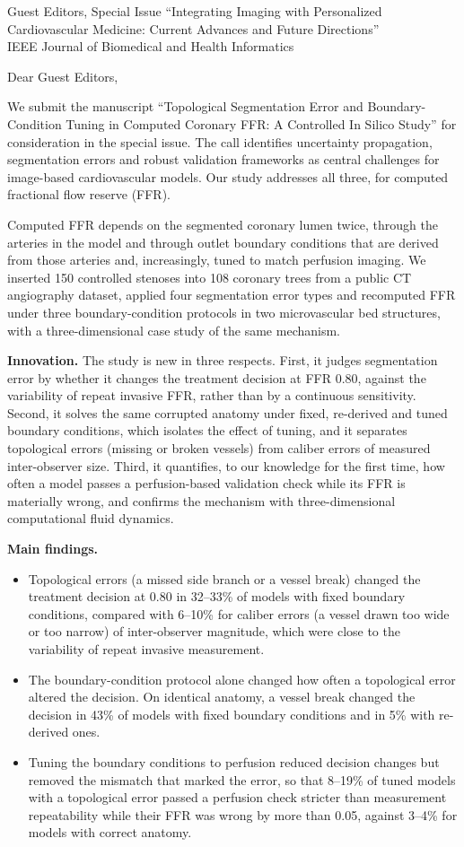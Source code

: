 \documentclass[10pt]{letter}
\date{\today}
\begin{document}
\begin{letter}{Guest Editors, Special Issue ``Integrating Imaging with Personalized Cardiovascular Medicine: Current
Advances and Future Directions''\\IEEE Journal of Biomedical and Health Informatics}
\opening{Dear Guest Editors,}

We submit the manuscript ``Topological Segmentation Error and Boundary-Condition Tuning in Computed Coronary FFR: A
Controlled In Silico Study'' for consideration in the special issue. The call identifies uncertainty propagation,
segmentation errors and robust validation frameworks as central challenges for image-based cardiovascular models. Our
study addresses all three, for computed fractional flow reserve (FFR).

Computed FFR depends on the segmented coronary lumen twice, through the arteries in the model and through outlet boundary conditions that are derived from those arteries and, increasingly, tuned to match perfusion imaging. We
inserted 150 controlled stenoses into 108 coronary trees from a public CT angiography dataset, applied four segmentation
error types and recomputed FFR under three boundary-condition protocols in two microvascular bed structures, with a
three-dimensional case study of the same mechanism.

\textbf{Innovation.} The study is new in three respects. First, it judges segmentation error by whether it changes
the treatment decision at FFR 0.80, against the variability of repeat invasive FFR, rather than by a continuous
sensitivity. Second, it solves the same corrupted anatomy under fixed, re-derived and tuned boundary conditions,
which isolates the effect of tuning, and it separates topological errors (missing or broken vessels) from caliber
errors of measured inter-observer size. Third, it quantifies, to our knowledge for the first time, how often a model
passes a perfusion-based validation check while its FFR is materially wrong, and confirms the mechanism with
three-dimensional computational fluid dynamics.

\textbf{Main findings.}
\begin{itemize}
\item Topological errors (a missed side branch or a vessel break) changed the treatment decision at 0.80 in 32--33\%
of models with fixed boundary conditions, compared with 6--10\% for caliber errors (a vessel drawn too wide or too narrow) of inter-observer magnitude, which
were close to the variability of repeat invasive measurement.
\item The boundary-condition protocol alone changed how often a topological error altered the decision. On identical anatomy, a vessel break changed the decision in 43\% of models with fixed boundary conditions and in 5\% with re-derived ones.
\item Tuning the boundary conditions to perfusion reduced decision changes but removed the mismatch that marked the error, so that 8--19\% of tuned models with a topological error passed a perfusion check stricter than measurement
repeatability while their FFR was wrong by more than 0.05, against 3--4\% for models with correct anatomy.
\end{itemize}


\end{letter}
\end{document}

